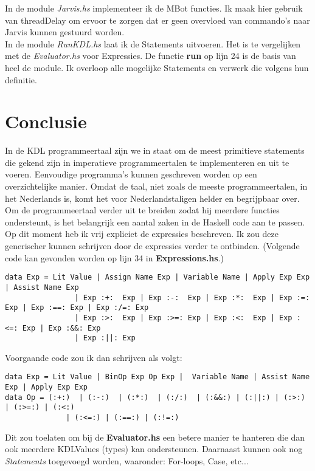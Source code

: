 \documentclass[a4paper]{article}
\begin{document}
In de module \textit{Jarvis.hs} implementeer ik de MBot functies. Ik maak hier gebruik van threadDelay om ervoor te zorgen dat er geen overvloed van commando's naar Jarvis kunnen gestuurd worden. \\

In de module \textit{RunKDL.hs} laat ik de Statements uitvoeren. Het is te vergelijken met de \textit{Evaluator.hs} voor Expressies. De functie \textbf{run} op lijn 24 is de basis van heel de module. Ik overloop alle mogelijke Statements en verwerk die volgens hun definitie.

\section{Conclusie}

In de KDL programmeertaal zijn we in staat om de meest primitieve statements die gekend zijn in imperatieve programmeertalen te implementeren en uit te voeren. Eenvoudige programma's kunnen geschreven worden op een overzichtelijke manier. Omdat de taal, niet zoals de meeste programmeertalen, in het Nederlands is, komt het voor Nederlandstaligen helder en begrijpbaar over. \\

Om de programmeertaal verder uit te breiden zodat hij meerdere functies ondersteunt, is het belangrijk een aantal zaken in de Haskell code aan te passen. Op dit moment heb ik vrij expliciet de expressies beschreven. Ik zou deze generischer kunnen schrijven door de expressies verder te ontbinden.  (Volgende code kan gevonden worden op lijn 34 in \textbf{Expressions.hs}.)
\begin{lstlisting}
data Exp = Lit Value | Assign Name Exp | Variable Name | Apply Exp Exp | Assist Name Exp 
				| Exp :+:  Exp | Exp :-:  Exp | Exp :*:  Exp | Exp :=:  Exp | Exp :==: Exp | Exp :/=: Exp 
				| Exp :>:  Exp | Exp :>=: Exp | Exp :<:  Exp | Exp :<=: Exp | Exp :&&: Exp
				| Exp :||: Exp
\end{lstlisting}
Voorgaande code zou ik dan schrijven als volgt:
\begin{lstlisting}
data Exp = Lit Value | BinOp Exp Op Exp |  Variable Name | Assist Name Exp | Apply Exp Exp
data Op = (:+:)  | (:-:)  | (:*:)  | (:/:)  | (:&&:) | (:||:) | (:>:)  | (:>=:) | (:<:)  
			  | (:<=:) | (:==:) | (:!=:)
\end{lstlisting}
Dit zou toelaten om bij de \textbf{Evaluator.hs} een betere manier te hanteren die dan ook meerdere KDLValues (types) kan ondersteunen. Daarnaast kunnen ook nog \textit{Statements} toegevoegd worden, waaronder: For-loops, Case, etc... \\
\end{document}
